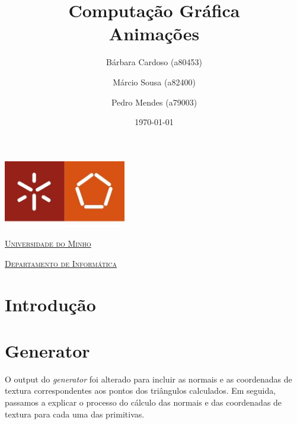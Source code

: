 \documentclass[a4paper]{article}
\begin{document}
\title{Computação Gráfica\\ Animações}
\author{Bárbara Cardoso (a80453) \and Márcio Sousa (a82400)
\and Pedro Mendes (a79003)}
\date{\today}

\begin{titlepage}

    \thispagestyle{empty}
    \begin{center}
        \begin{minipage}{0.75\linewidth}
            \centering
            \includegraphics[width=0.4\textwidth]{eng.jpeg}\par\vspace{1cm}
            \vspace{1.5cm}
            \href{https://www.uminho.pt/PT}
            {\scshape\LARGE Universidade do Minho} \par
            \vspace{1cm}
            \href{https://www.di.uminho.pt/}
            {\scshape\Large Departamento de Informática} \par
            \vspace{1.5cm}

            \maketitle
        \end{minipage}
    \end{center}

\end{titlepage}

\tableofcontents

\pagebreak

\section{Introdução}

\section{Generator}

O output do \textit{generator} foi alterado para incluir as normais e as
coordenadas de textura correspondentes aos pontos dos triângulos calculados.
Em seguida, passamos a explicar o processo do cálculo das normais e das
coordenadas de textura para cada uma das primitivas.
\end{document}
